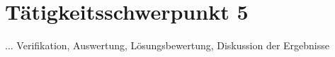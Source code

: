 \chapter{Tätigkeitsschwerpunkt 5}
\label{cha:Tätigkeitsschwerpunkt 5}

... Verifikation, Auswertung, Lösungsbewertung, Diskussion der Ergebnisse